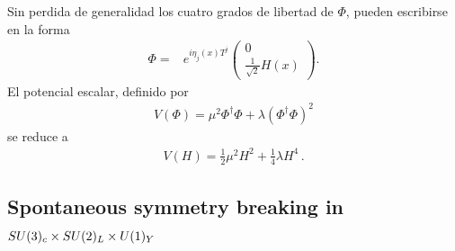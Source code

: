 \begin{frame}
Sin perdida de generalidad los cuatro grados de libertad de $\Phi$, pueden escribirse en la forma
\begin{align}
\label{eq:polarhiggs}
  \Phi=&e^{i\eta_j(x)T^j}
  \begin{pmatrix}
    0\\
    \frac{1}{\sqrt{2}}H(x)
  \end{pmatrix}.
\end{align}
El potencial escalar, definido por
\begin{align}
  V(\Phi)=\mu^2\Phi^\dagger\Phi+\lambda(\Phi^\dagger\Phi)^2
\end{align}
se reduce a
\begin{align}
  V(H)=\frac{1}{2}\mu^2H^2+\frac{1}{4}\lambda H^4\,.
\end{align}

\end{frame}
\subsection{Spontaneous symmetry breaking in $SU(3)_c\times  SU(2)_L\times  U(1)_Y$}

